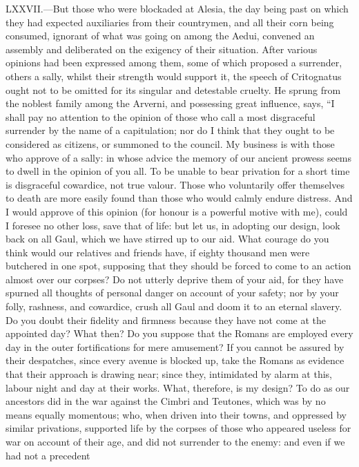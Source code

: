 LXXVII.—But those who were blockaded at Alesia, the day being past on
which they had expected auxiliaries from their countrymen, and all their
corn being consumed, ignorant of what was going on among the Aedui,
convened an assembly and deliberated on the exigency of their situation.
After various opinions had been expressed among them, some of which
proposed a surrender, others a sally, whilst their strength would
support it, the speech of Critognatus ought not to be omitted for its
singular and detestable cruelty. He sprung from the noblest family among
the Arverni, and possessing great influence, says, ``I shall pay no
attention to the opinion of those who call a most disgraceful surrender
by the name of a capitulation; nor do I think that they ought to be
considered as citizens, or summoned to the council. My business is with
those who approve of a sally: in whose advice the memory of our ancient
prowess seems to dwell in the opinion of you all. To be unable to bear
privation for a short time is disgraceful cowardice, not true valour.
Those who voluntarily offer themselves to death are more easily found
than those who would calmly endure distress. And I would approve of this
opinion (for honour is a powerful motive with me), could I foresee no
other loss, save that of life: but let us, in adopting our design, look
back on all Gaul, which we have stirred up to our aid. What courage do
you think would our relatives and friends have, if eighty thousand men
were butchered in one spot, supposing that they should be forced to come
to an action almost over our corpses? Do not utterly deprive them of
your aid, for they have spurned all thoughts of personal danger on
account of your safety; nor by your folly, rashness, and cowardice,
crush all Gaul and doom it to an eternal slavery. Do you doubt their
fidelity and firmness because they have not come at the appointed day?
What then? Do you suppose that the Romans are employed every day in the
outer fortifications for mere amusement? If you cannot be assured by
their despatches, since every avenue is blocked up, take the Romans as
evidence that their approach is drawing near; since they, intimidated by
alarm at this, labour night and day at their works. What, therefore, is
my design? To do as our ancestors did in the war against the Cimbri and
Teutones, which was by no means equally momentous; who, when driven into
their towns, and oppressed by similar privations, supported life by the
corpses of those who appeared useless for war on account of their age,
and did not surrender to the enemy: and even if we had not a precedent
